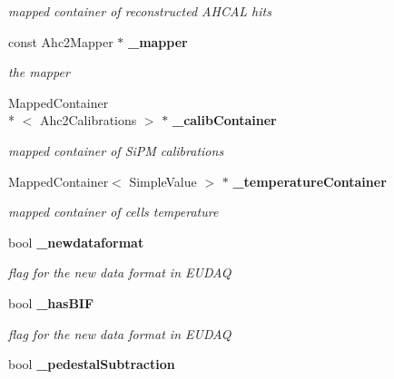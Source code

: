 \begin{DoxyCompactItemize}
\begin{DoxyCompactList}\small\item\em mapped container of reconstructed A\-H\-C\-A\-L hits \end{DoxyCompactList}\item 
const Ahc2\-Mapper $\ast$ {\bf \-\_\-mapper}\label{classCALICE_1_1Ahc2CalibrateProcessor_a72a7da187cbb927297e330c3d0bf63dc}

\begin{DoxyCompactList}\small\item\em the mapper \end{DoxyCompactList}\item 
Mapped\-Container\\*
$<$ Ahc2\-Calibrations $>$ $\ast$ {\bf \-\_\-calib\-Container}\label{classCALICE_1_1Ahc2CalibrateProcessor_af32eea30839db78e5e5aa45c42dac715}

\begin{DoxyCompactList}\small\item\em mapped container of Si\-P\-M calibrations \end{DoxyCompactList}\item 
Mapped\-Container$<$ Simple\-Value $>$ $\ast$ {\bf \-\_\-temperature\-Container}\label{classCALICE_1_1Ahc2CalibrateProcessor_a8f227d17ea78bb5f560d695725099e93}

\begin{DoxyCompactList}\small\item\em mapped container of cells temperature \end{DoxyCompactList}\item 
bool {\bf \-\_\-newdataformat}\label{classCALICE_1_1Ahc2CalibrateProcessor_a8bae2aa3700e81f9f739a3d64c3e7cbb}

\begin{DoxyCompactList}\small\item\em flag for the new data format in E\-U\-D\-A\-Q \end{DoxyCompactList}\item 
bool {\bf \-\_\-has\-B\-I\-F}\label{classCALICE_1_1Ahc2CalibrateProcessor_a733c7dc2c412bba4ed34e4ffd0598784}

\begin{DoxyCompactList}\small\item\em flag for the new data format in E\-U\-D\-A\-Q \end{DoxyCompactList}\item 
bool {\bf \-\_\-pedestal\-Subtraction}\label{classCALICE_1_1Ahc2CalibrateProcessor_aad858c334434d3f75b9d993aaf60f076}


\end{DoxyCompactItemize}
